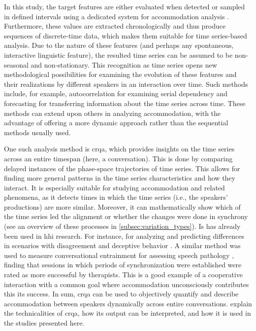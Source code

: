 In this study, the target features are either evaluated when detected or sampled in defined intervals using a dedicated system for accommodation analysis \citep[][and see details in \cref{sec:dataset_calls}]{Raveh2018Specom}.
Furthermore, these values are extracted chronologically and thus produce sequences of discrete-time data, which makes them suitable for time series-based analysis.
Due to the nature of these features (and perhaps any spontaneous, interactive linguistic feature), the resulted time series can be assumed to be non-seasonal and non-stationary.
This recognition as time series opens new methodological possibilities for examining the evolution of these features and their realizations by different speakers in an interaction over time.
Such methods include, for example, autocorrelation for examining serial dependency and forecasting for transferring information about the time series across time.
These methods can extend upon others in analyzing accommodation, with the advantage of offering a more dynamic approach rather than the sequential methods usually used.

One such analysis method is \acf{crqa}, which provides insights on the time series across an entire timespan (here, a conversation).
This is done by comparing delayed instances of the phase-space trajectories of time series.
This allows for finding more general patterns in the time series characteristics and how they interact.
It is especially suitable for studying accommodation and related phenomena, as it detects times in which the time series (i.e., the speakers' productions) are more similar.
Moreover, it can mathematically show which of the time series led the alignment or whether the changes were done in synchrony (see an overview of these processes in \cref{subsec:variation_types}).
Is has already been used in \ac{hhi} research.
For instance, for analyzing and predicting differences in scenarios with disagreement and deceptive behavior \citep{Duran2017conversing}.
A similar method was used to measure conversational entrainment for assessing speech pathology \citep{Borrie2019syncing}, finding that sessions in which periods of synchronization were established were rated as more successful by therapists.
This is a good example of a cooperative interaction with a common goal where accommodation unconsciously contributes this its success.
In sum, \ac{crqa} can be used to objectively quantify and describe accommodation between speakers dynamically across entire conversations.
 explain the technicalities of \ac{crqa}, how its output can be interpreted, and how it is used in the studies presented here.

